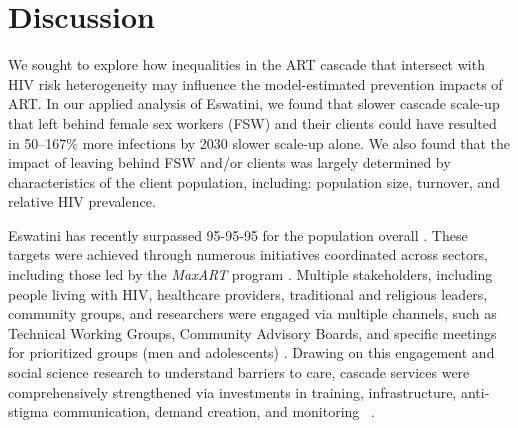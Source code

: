 \section{Discussion}\label{art.disc}
We sought to explore how inequalities in the ART cascade
that intersect with HIV risk heterogeneity
may influence the model-estimated prevention impacts of ART.
In our applied analysis of Eswatini, we found that
slower cascade scale-up that left behind female sex workers (FSW) and their clients
could have resulted in 50--167\% more infections by 2030 \vs slower scale-up alone.
We also found that the impact of
leaving behind FSW and/or clients was largely determined by
characteristics of the client population, including:
population size, turnover, and relative HIV prevalence.
\par
Eswatini has recently surpassed 95-95-95 for the population overall \cite{SHIMS3}.
These targets were achieved through
numerous initiatives coordinated across sectors,
including those led by the \emph{MaxART} program \cite{MaxART2}.
Multiple stakeholders, including people living with HIV, healthcare providers,
traditional and religious leaders, community groups, and researchers
were engaged via multiple channels, such as
Technical Working Groups, Community Advisory Boards,
and specific meetings for prioritized groups (men and adolescents) \cite{MaxART2}.
Drawing on this engagement and
social science research to understand barriers to care,
cascade services were comprehensively strengthened via investments in
training, infrastructure, anti-stigma communication, demand creation, and monitoring~%
\cite{MaxART2}.
